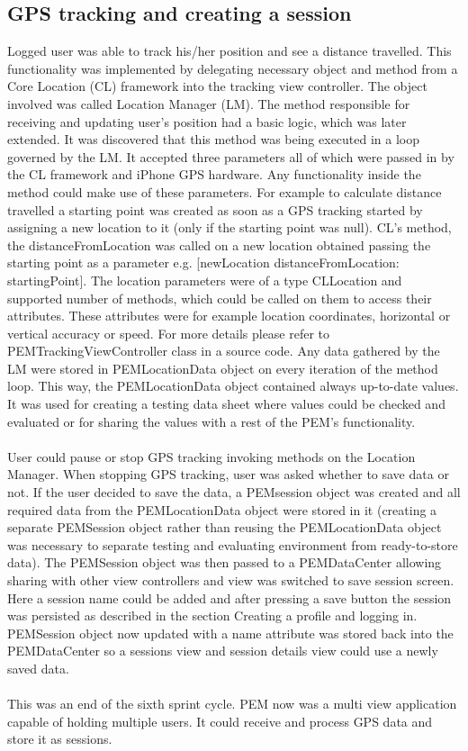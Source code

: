\documentclass[12pt, a4paper]{report}   %
\begin{document}
\begin{enumerate}
\section{GPS tracking and creating a session}
Logged user was able to track his/her position and see a distance travelled. This functionality was implemented by delegating necessary object and method from a Core Location (CL) framework into the tracking view controller. The object involved was called Location Manager (LM). The method responsible for receiving and updating user's position had a basic logic, which was later extended. It was discovered that this method was being executed in a loop governed by the LM. It accepted three parameters all of which were passed in by the CL framework and iPhone GPS hardware. Any functionality inside the method could make use of these parameters. For example to calculate distance travelled a starting point was created as soon as a GPS tracking started by assigning a new location to it (only if the starting point was null). CL's method, the distanceFromLocation was called on a new location obtained passing the starting point as a parameter e.g. [newLocation distanceFromLocation: startingPoint]. The location parameters were of a type CLLocation and supported number of methods, which could be called on them to access their attributes. These attributes were for example location coordinates, horizontal or vertical accuracy or speed. For more details please refer to PEMTrackingViewController class in a source code. Any data gathered by the LM were stored in PEMLocationData object on every iteration of the method loop. This way, the PEMLocationData object contained always up-to-date values. It was used for creating a testing data sheet where values could be checked and evaluated or for sharing the values with a rest of the PEM's functionality.\\ \\
User could pause or stop GPS tracking invoking methods on the Location Manager. When stopping GPS tracking, user was asked whether to save data or not. If the user decided to save the data, a PEMsession object was created and all required data from the PEMLocationData object were stored in it (creating a separate PEMSession object rather than reusing the PEMLocationData object was necessary to separate testing and evaluating environment from ready-to-store data). The PEMSession object was then passed to a PEMDataCenter allowing sharing with other view controllers and view was switched to save session screen. Here a session name could be added and after pressing a save button the session was persisted as described in the section Creating a profile and logging in. PEMSession object now updated with a name attribute was stored back into the PEMDataCenter so a sessions view and session details view could use a newly saved data.\\ \\
This was an end of the sixth sprint cycle. PEM now was a multi view application capable of holding multiple users. It could receive and process GPS data and store it as sessions.



\end{enumerate}
\end{document}
